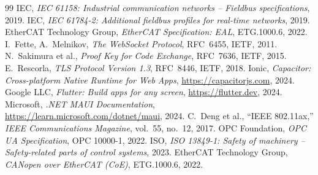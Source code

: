 ﻿\documentclass[12pt,a4paper]{article}
\begin{document}
\begin{thebibliography}{99}
 IEC, \textit{IEC 61158: Industrial communication networks -- Fieldbus
  specifications}, 2019.
 IEC, \textit{IEC 61784-2: Additional fieldbus profiles for real-time
  networks}, 2019.
 EtherCAT Technology Group, \textit{EtherCAT Specification: EAL},
  ETG.1000.6, 2022.
 I.~Fette, A.~Melnikov, \textit{The WebSocket Protocol}, RFC~6455, IETF,
  2011.
 N.~Sakimura et al., \textit{Proof Key for Code Exchange}, RFC~7636,
  IETF, 2015.
 E.~Rescorla, \textit{TLS Protocol Version 1.3}, RFC~8446, IETF, 2018.
 Ionic, \textit{Capacitor: Cross-platform Native Runtime for Web Apps},
  \url{https://capacitorjs.com}, 2024.
 Google LLC, \textit{Flutter: Build apps for any screen},
  \url{https://flutter.dev}, 2024.
 Microsoft, \textit{.NET MAUI Documentation},
  \url{https://learn.microsoft.com/dotnet/maui}, 2024.
 C.~Deng et al., ``IEEE 802.11ax,'' \textit{IEEE Communications Magazine},
  vol.~55, no.~12, 2017.
 OPC Foundation, \textit{OPC UA Specification}, OPC 10000-1, 2022.
 ISO, \textit{ISO 13849-1: Safety of machinery -- Safety-related parts
  of control systems}, 2023.
 EtherCAT Technology Group, \textit{CANopen over EtherCAT (CoE)},
  ETG.1000.6, 2022.
\end{thebibliography}
\end{document}
